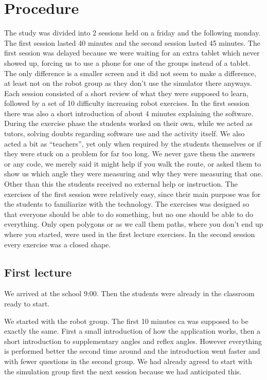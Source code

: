 \chapter{Procedure}
The study was divided into 2 sessions held on a friday and the following monday. The first session lasted 40 minutes and the second session lasted 45 minutes. The first session was delayed because we were waiting for an extra tablet which never showed up, forcing us to use a phone for one of the groups instead of a tablet. The only difference is a smaller screen and it did not seem to make a difference, at least not on the robot group as they don't use the simulator there anyways. Each session consisted of a short review of what they were supposed to learn, followed by a set of 10 difficulty increasing robot exercises. In the first session there was also a short introduction of about 4 minutes explaining the software. During the exercise phase the students worked on their own, while we acted as tutors, solving doubts regarding software use and the activity itself. We also acted a bit as "`teachers"', yet only when required by the students themselves or if they were stuck on a problem for far too long. We never gave them the answers or any code, we merely said it might help if you walk the route, or asked them to show us which angle they were measuring and why they were measuring that one. Other than this the students received no external help or instruction. The exercises of the first session were relatively easy, since their main purpose was for the students to familiarize with the technology. The exercises was designed so that everyone should be able to do something, but no one should be able to do everything. Only open polygons or as we call them paths, where you don't end up where you started, were used in the first lecture exercises. In the second session every exercise was a closed shape. 


\section{First lecture}
We arrived at the school 9:00. Then the students were already in the classroom ready to start. 

\bigskip\noindent
We started with the robot group. The first 10 minutes ca was supposed to be exactly the same. First a small introduction of how the application works, then a short introduction to supplementary angles and reflex angles. However everything is performed better the second time around and the introduction went faster and with fewer questions in the second group. We had already agreed to start with the simulation group first the next session because we had anticipated this.

